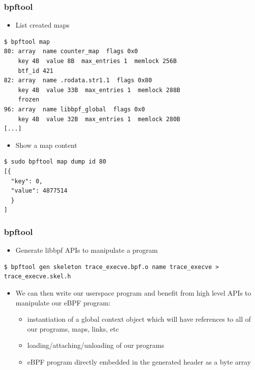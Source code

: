 \begin{frame}[fragile]
  \frametitle{bpftool}
  \begin{itemize}
    \item List created maps
  \end{itemize}
  \begin{block}{}
    \fontsize{9}{9}\selectfont
    \begin{verbatim}
$ bpftool map
80: array  name counter_map  flags 0x0
    key 4B  value 8B  max_entries 1  memlock 256B
    btf_id 421
82: array  name .rodata.str1.1  flags 0x80
    key 4B  value 33B  max_entries 1  memlock 288B
    frozen
96: array  name libbpf_global  flags 0x0
    key 4B  value 32B  max_entries 1  memlock 280B
[...]
    \end{verbatim}
  \end{block}
  \begin{itemize}
    \item Show a map content
  \end{itemize}
  \begin{block}{}
    \fontsize{9}{9}\selectfont
    \begin{verbatim}
$ sudo bpftool map dump id 80
[{
  "key": 0,
  "value": 4877514
  }
]
    \end{verbatim}
  \end{block}
\end{frame}

\begin{frame}[fragile]
  \frametitle{bpftool}
  \begin{itemize}
    \item Generate libbpf APIs to manipulate a program
  \end{itemize}
  \begin{block}{}
    \fontsize{9}{9}\selectfont
    \begin{verbatim}
$ bpftool gen skeleton trace_execve.bpf.o name trace_execve > trace_execve.skel.h
    \end{verbatim}
  \end{block}
  \begin{itemize}
    \item We can then write our userspace program and benefit from high level
    APIs to manipulate our eBPF program:
    \begin{itemize}
      \item instantiation of a global context object which will have references
      to all of our programs, maps, links, etc
      \item loading/attaching/unloading of our programs
      \item eBPF program directly embedded in the generated header as a byte
      array
    \end{itemize}
  \end{itemize}
\end{frame}

